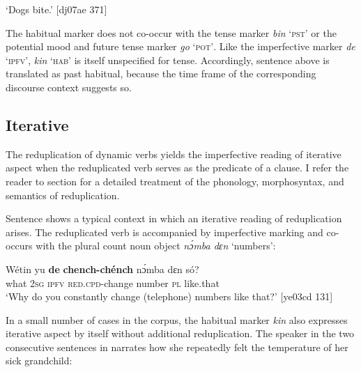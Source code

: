 \glt ‘Dogs bite.’ [dj07ae 371]
\z

The habitual marker does not co-occur with the tense marker \textit{bin} ‘\textsc{pst’} or the potential mood and future tense marker \textit{go} ‘\textsc{pot’}. Like the imperfective marker \textit{de} ‘\textsc{ipfv}’, \textit{kin} ‘\textsc{hab}’ is itself unspecified for tense. Accordingly, sentence  above is translated as past habitual, because the time frame of the corresponding discourse context suggests so. 

\subsection{Iterative}\label{sec:6.3.6}

The reduplication of dynamic verbs yields the imperfective reading of iterative aspect when the reduplicated verb serves as the predicate of a clause. I refer the reader to section  for a detailed treatment of the phonology, morphosyntax, and semantics of reduplication.


Sentence  shows a typical context in which an iterative reading of reduplication arises. The reduplicated verb is accompanied by imperfective marking and co-occurs with the plural count noun object \textit{nɔ́mba dɛn} ‘numbers’:



\ea%
    \label{ex:key:347}
    \gll Wétin  yu  \textbf{de}  \textbf{chench-chénch}  nɔ́mba  dɛn  só?\\
what  \textsc{2sg}  \textsc{ipfv}  \textsc{red.cpd-}change  number  \textsc{pl}  like.that\\

\glt ‘Why do you constantly change (telephone) numbers like that?’ [ye03cd 131]
\z

In a small number of cases in the corpus, the habitual marker \textit{kin} also expresses iterative aspect by itself without additional reduplication. The speaker in the two consecutive sentences in  narrates how she repeatedly felt the temperature of her sick grandchild: 



